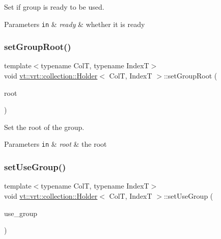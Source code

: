 Set if group is ready to be used. 


\begin{DoxyParams}[1]{Parameters}
\mbox{\tt in}  & {\em ready} & whether it is ready \\
\hline
\end{DoxyParams}
\mbox{\label{structvt_1_1vrt_1_1collection_1_1_holder_a9805b84e57120bc7088058f782eb56f4}} 
\subsubsection{\texorpdfstring{set\+Group\+Root()}{setGroupRoot()}}
{\footnotesize\ttfamily template$<$typename ColT, typename IndexT$>$ \\
void \hyperlink{structvt_1_1vrt_1_1collection_1_1_holder}{vt\+::vrt\+::collection\+::\+Holder}$<$ ColT, IndexT $>$\+::set\+Group\+Root (\begin{DoxyParamCaption}\item[{\hyperlink{namespacevt_a866da9d0efc19c0a1ce79e9e492f47e2}{Node\+Type} const}]{root }\end{DoxyParamCaption})\hspace{0.3cm}{\ttfamily [inline]}}



Set the root of the group. 


\begin{DoxyParams}[1]{Parameters}
\mbox{\tt in}  & {\em root} & the root \\
\hline
\end{DoxyParams}
\mbox{\label{structvt_1_1vrt_1_1collection_1_1_holder_aa76e02e027429572c1c9b2169d013e56}} 
\subsubsection{\texorpdfstring{set\+Use\+Group()}{setUseGroup()}}
{\footnotesize\ttfamily template$<$typename ColT, typename IndexT$>$ \\
void \hyperlink{structvt_1_1vrt_1_1collection_1_1_holder}{vt\+::vrt\+::collection\+::\+Holder}$<$ ColT, IndexT $>$\+::set\+Use\+Group (\begin{DoxyParamCaption}\item[{bool const}]{use\+\_\+group }\end{DoxyParamCaption})\hspace{0.3cm}{\ttfamily [inline]}}



